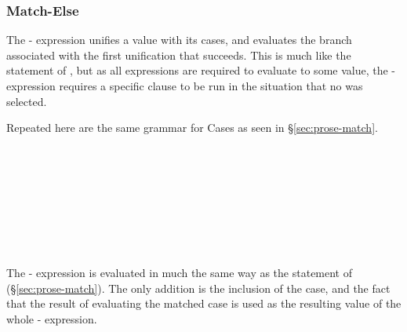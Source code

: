 \subsubsection{Match-Else}

The - expression unifies a value with its cases, and evaluates the
branch associated with the first unification that succeeds. This is much
like the  statement of \Prose{}, but as all expressions are required
to evaluate to some value, the - expression requires a specific
 clause to be run in the situation that no  was selected.

Repeated here are the same grammar for Cases as seen in \S\ref{sec:prose-match}.

\begin{bnf*}
     \\
     \\
     \\
     \\
     \\
     \\
     \\
\end{bnf*}

The - expression is evaluated in much the same way as the 
statement of \Prose{} (\S\ref{sec:prose-match}). The only addition is the inclusion of
the  case, and the fact that the result of evaluating the matched case is used
as the resulting value of the whole - expression.

